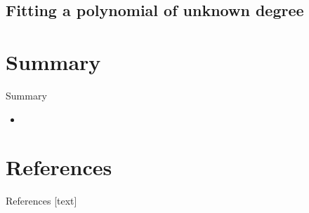 \documentclass[11pt,aspectratio=1610,dvipsnames]{beamer}
\begin{document}
\subsection{Fitting a polynomial of unknown degree}

\section{Summary}
\begin{frame}{Summary}
	\begin{tcolorbox}[colback=black!5,colframe=gray!15!black,title=, width=\linewidth]
		\begin{itemize}
			\item 
		\end{itemize}
	\end{tcolorbox}
\end{frame}

\section*{References}
\begin{frame}[allowframebreaks]{References}
	[text]

	\printbibliography
\end{frame}
\end{document}
